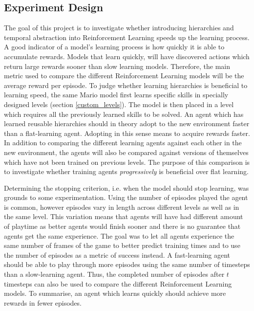 \documentclass[notitlepage,a4paper,11pt]{article}
\begin{document}
\subsection{Experiment Design}
The goal of this project is to investigate whether introducing hierarchies and temporal abstraction into Reinforcement Learning speeds up the learning process. A good indicator of a model's learning process is how quickly it is able to accumulate rewards. Models that learn quickly, will have discovered actions which return large rewards sooner than slow learning models. Therefore, the main metric used to compare the different Reinforcement Learning models will be the average reward per episode. To judge whether learning hierarchies is beneficial to learning speed, the same Mario model first learns specific skills in specially designed levels (section \ref{custom_levels}). The model is then placed in a level which requires all the previously learned skills to be solved. An agent which has learned reusable hierarchies should in theory adopt to the new environment faster than a flat-learning agent. Adopting in this sense means to acquire rewards faster. In addition to comparing the different learning agents against each other in the new environment, the agents will also be compared against versions of themselves which have not been trained on previous levels. The purpose of this comparison is to investigate whether training agents \textit{progressively} is beneficial over flat learning.

Determining the stopping criterion, i.e. when the model should stop learning, was grounds to some experimentation. Using the number of episodes played the agent is common, however episodes vary in length across different levels as well as in the same level. This variation means that agents will have had different amount of playtime as better agents would finish sooner and there is no guarantee that agents get the same experience. The goal was to let all agents experience the same number of frames of the game to better predict training times and to use the number of episodes as a metric of success instead. A fast-learning agent should be able to play through more episodes using the same number of timesteps than a slow-learning agent. Thus, the completed number of episodes after $t$ timesteps can also be used to compare the different Reinforcement Learning models. To summarise, an agent which learns quickly should achieve more rewards in fewer episodes.
\end{document}
